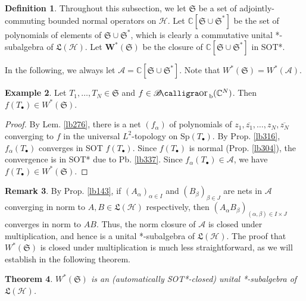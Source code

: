 \documentclass[12pt,b5paper,notitlepage]{article}
\theoremstyle{definition}
\newtheorem{df}{Definition}[subsection]
\newtheorem{eg}[df]{Example}
\newtheorem{rem}[df]{Remark}
\theoremstyle{plain}
\newtheorem{thm}[df]{Theorem}
\DeclareMathOperator{\Borb}{{\mathscr{B}\text{\kern -2pt {\calligra\large or}}\,}_{\mathrm b}}
\newcommand{\fk}{\mathfrak}
\newcommand{\ovl}{\overline}
\newcommand{\blt}{\bullet}
\newcommand{\Cbb}{\mathbb C}
\newcommand{\Sp}{\mathrm{Sp}}
\newcommand{\MH}{\mathcal H}
\newcommand{\SA}{\mathscr A}
\numberwithin{equation}{section}
\begin{document}
\begin{df}\label{lb336}
Throughout this subsection, we let $\fk S$ be a set of adjointly-commuting bounded normal operators on $\MH$. Let $\pmb{\Cbb[\fk S\cup\fk S^*]}$ be the set of polynomials of elements of $\fk S\cup\fk S^*$, which is clearly a commutative unital *-subalgebra of $\fk L(\MH)$. Let $\pmb {W^*(\fk S)}$ be the closure of $\Cbb[\fk S\cup\fk S^*]$ in SOT*.
\end{df}

In the following, we always let $\SA=\Cbb[\fk S\cup\fk S^*]$. Note that $W^*(\fk S)=W^*(\SA)$.

\begin{eg}\label{lb340}
Let $T_1,\dots,T_N\in\fk S$ and $f\in\Borb(\Cbb^N)$. Then $f(T_\blt)\in W^*(\fk S)$.
\end{eg}


\begin{proof}
By Lem. \ref{lb276}, there is a net $(f_\alpha)$ of polynomials of $z_1,\ovl{z_1},\dots,z_N,\ovl{z_N}$ converging to $f$ in the universal $L^2$-topology on $\Sp(T_\blt)$. By Prop. \ref{lb316}, $f_\alpha(T_\blt)$ converges in SOT $f(T_\blt)$. Since $f(T_\blt)$ is normal (Prop. \ref{lb304}), the convergence is in SOT* due to Pb. \ref{lb337}. Since $f_\alpha(T_\blt)\in\SA$, we have $f(T_\blt)\in W^*(\fk S)$.
\end{proof}


\begin{rem}
By Prop. \ref{lb143}, if $(A_\alpha)_{\alpha\in I}$ and $(B_\beta)_{\beta\in J}$ are nets in $\SA$ converging in norm to $A,B\in\fk L(\MH)$ respectively, then $(A_\alpha B_\beta)_{(\alpha,\beta)\in I\times J}$ converges in norm to $AB$. Thus, the norm closure of $\SA$ is closed under multiplication, and hence is a unital *-subalgebra of $\fk L(\MH)$. The proof that $W^*(\fk S)$ is closed under multiplication is much less straightforward, as we will establish in the following theorem.
\end{rem}


\begin{thm}\label{lb338}
$W^*(\fk S)$ is an (automatically SOT*-closed) unital *-subalgebra of $\fk L(\MH)$.
\end{thm}
\end{document}
